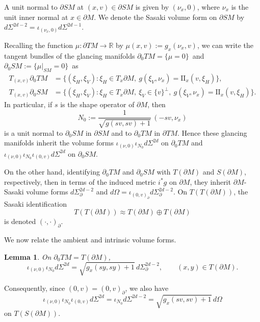 \documentclass[JEP,XML,SOM,Unicode,NoFloatCountersInSection, NoEqCountersInSection,published]{cedram}
\theoremstyle{plain}
\newtheorem{Lemma}[Theorem]{Lemma}
\theoremstyle{definition}
\theoremstyle{remark}
\def\Rm{{\mathbb{R}}}
\def\two{\mathrm{II}}
\begin{document}
A unit normal to $\partial SM$ at $(x,v) \in \partial SM$ is given by $(\nu_x,0)$, where $\nu_x$ is the unit inner normal at
$x\in \partial M$. We denote the Sasaki volume form on $\partial SM$ by $d\Sigma^{2d-2} = \iota_{(\nu_x,0)} d\Sigma^{2d-1}$.

Recalling the function $\mu\colon \partial TM\to \Rm$ by $\mu(x,v) := g_x(\nu_x, v)$, we can write the tangent bundles
of the glancing manifolds \hbox{$\partial_0 TM = \{\mu=0\}$ and $\partial_0 SM := \{\mu|_{SM} =0\}$}~as
\begin{align*}
T_{(x,v)} \partial_0 TM &= \{ (\xi_H,\xi_V)\colon \xi_H \in T_x \partial M,\ g(\xi_V, \nu_x) = \two_x(v,\xi_H) \}, \\
T_{(x,v)} \partial_0 SM &= \{ (\xi_H,\xi_V)\colon \xi_H \in T_x \partial M,\ \xi_V \in \{v\}^\perp,\ g(\xi_V, \nu_x) = \two_x(v,\xi_H) \}.
\end{align*}
In particular, if $s$ is the shape operator of $\partial M$, then
\begin{equation*}
N_0 := \frac{1}{\sqrt{g(sv,sv) + 1}}\, (-sv,\nu_x)
\end{equation*}
is a unit normal to $\partial_0 SM$ in $\partial SM$ and to $\partial_0 TM$ in $\partial TM$. Hence these glancing manifolds
inherit the volume forms $\iota_{(\nu,0)} \iota_{N_0} d\Sigma^{2d}$ on $\partial_0 TM$ and
$\iota_{(\nu,0)} \iota_{N_0} \iota_{(0,v)} d\Sigma^{2d}$ on $\partial_0 SM$.

On the other hand, identifying $\partial_0 TM$ and $\partial_0 SM$ with $T(\partial M)$ and $S(\partial M)$, respectively,
then in terms of the induced metric $i^* g$ on $\partial M$, they inherit $\partial M$-Sasaki volume forms $d\Sigma^{2d-2}_\partial$
and $d\Omega = \iota_{(0,v)_\partial} d\Sigma^{2d-2}_\partial$. On $T(T(\partial M))$, the Sasaki identification
\begin{equation*}
T(T (\partial M)) \approx T(\partial M) \oplus T(\partial M)
\end{equation*}
is denoted $(\cdot,\cdot)_\partial$.

We now relate the ambient and intrinsic volume forms.
\begin{Lemma}\label{lem:Sasakirec}
On $\partial_0 TM = T(\partial M)$,
\begin{equation*}
\iota_{(\nu,0)} \iota_{N_0} d\Sigma^{2d} = \sqrt{g_x(sy,sy) + 1}\,d\Sigma_\partial^{2d-2}, \qquad (x,y)\in T(\partial M).
\end{equation*}
\end{Lemma}
Consequently, since $(0,v) = (0,v)_\partial$, we also have
\begin{equation}
\iota_{(\nu,0)} \iota_{N_0} \iota_{(0,v)} d\Sigma^{2d} = \iota_{N_0} d\Sigma^{2d-2} = \sqrt{g_x(sv,sv)+1}\,d\Omega
\label{eq:Sasakirec2}
\end{equation}
on $T(S(\partial M))$.
\end{document}
